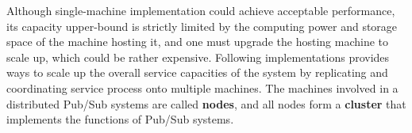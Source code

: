 Although single-machine implementation could achieve acceptable performance, its capacity upper-bound is strictly limited by the computing power and storage space of the machine hosting it, and one must upgrade the hosting machine to scale up, which could be rather expensive. Following implementations provides ways to scale up the overall service capacities of the system by replicating and coordinating service process onto multiple machines. The machines involved in a distributed Pub/Sub systems are called \textbf{nodes}, and all nodes form a \textbf{cluster} that implements the functions of Pub/Sub systems.
